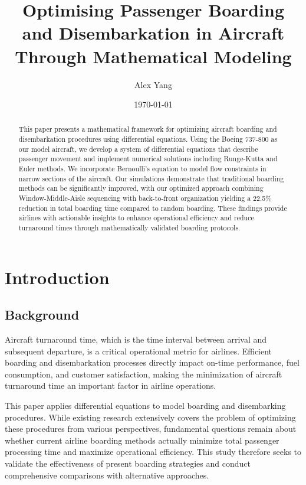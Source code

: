 \documentclass[a4paper,12pt]{article}
\title{Optimising Passenger Boarding and Disembarkation in Aircraft Through Mathematical Modeling}
\author{Alex Yang}
\date{\today}
\begin{document}
\maketitle

\begin{abstract}
This paper presents a mathematical framework for optimizing aircraft boarding and disembarkation procedures using differential equations. Using the Boeing 737-800 as our model aircraft, we develop a system of differential equations that describe passenger movement and implement numerical solutions including Runge-Kutta and Euler methods. We incorporate Bernoulli's equation to model flow constraints in narrow sections of the aircraft. Our simulations demonstrate that traditional boarding methods can be significantly improved, with our optimized approach combining Window-Middle-Aisle sequencing with back-to-front organization yielding a 22.5\% reduction in total boarding time compared to random boarding. These findings provide airlines with actionable insights to enhance operational efficiency and reduce turnaround times through mathematically validated boarding protocols.
\end{abstract}

\section{Introduction}

\subsection{Background}

Aircraft turnaround time, which is the time interval between arrival and subsequent departure, is a critical operational metric for airlines. Efficient boarding and disembarkation processes directly impact on-time performance, fuel consumption, and customer satisfaction, making the minimization of aircraft turnaround time an important factor in airline operations.

This paper applies differential equations to model boarding and disembarking procedures. While existing research extensively covers the problem of optimizing these procedures from various perspectives, fundamental questions remain about whether current airline boarding methods actually minimize total passenger processing time and maximize operational efficiency. This study therefore seeks to validate the effectiveness of present boarding strategies and conduct comprehensive comparisons with alternative approaches.
\end{document}
